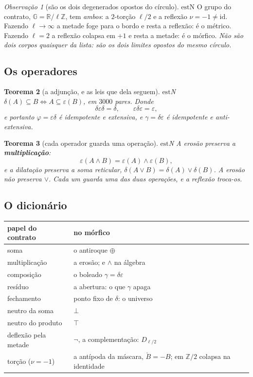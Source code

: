 \documentclass[11pt]{article}
\theoremstyle{plain}
\newtheorem{teorema}{Teorema}
\theoremstyle{remark}
\providecommand{\est}{\ensuremath{\mathrm{est}}}
\providecommand{\GG}{\ensuremath{\mathbb{G}}}
\providecommand{\RR}{\ensuremath{\mathbb{R}}}
\providecommand{\ZZ}{\ensuremath{\mathbb{Z}}}
\newtheorem{corolario}[teorema]{Observação}
\begin{document}
\begin{corolario}[são os dois degenerados opostos do círculo]\label{cor:degenerados}
\est{N} O grupo do contrato, $\GG=\RR/\ell\ZZ$, tem \emph{ambos}: a $2$-torção $\ell/2$ e a reflexão $\nu=-1\neq
\mathrm{id}$. Fazendo $\ell\to\infty$ a metade foge para o bordo e resta a reflexão: é o métrico. Fazendo
$\ell=2$ a reflexão colapsa em $+1$ e resta a metade: é o mórfico. \emph{Não são dois corpos quaisquer da lista:
são os dois limites opostos do mesmo círculo.}
\end{corolario}

\subsection{Os operadores}

\begin{teorema}[a adjunção, e as leis que dela seguem]\label{teo:adjuncao}
\est{N} $\delta(A)\subseteq B \iff A\subseteq\varepsilon(B)$, em $3000$ pares. Donde
\[
\delta\varepsilon\delta=\delta,
\qquad
\varepsilon\delta\varepsilon=\varepsilon,
\]
e portanto $\varphi=\varepsilon\delta$ é idempotente e extensiva, e $\gamma=\delta\varepsilon$ é idempotente e
anti-extensiva.
\end{teorema}

\begin{teorema}[cada operador guarda uma operação]\label{teo:guarda}
\est{N} A erosão preserva a \textbf{multiplicação}:
\[
\varepsilon(A\wedge B)=\varepsilon(A)\wedge\varepsilon(B),
\]
e a dilatação preserva a soma reticular, $\delta(A\vee B)=\delta(A)\vee\delta(B)$. A erosão \emph{não} preserva
$\vee$. Cada um guarda uma das duas operações, e a reflexão troca-os.
\end{teorema}

\subsection{O dicionário}

\begin{center}
\renewcommand{\arraystretch}{1.3}
\begin{tabular}{ll}
\hline
\textbf{papel do contrato} & \textbf{no mórfico}\\
\hline
soma & o antiroque $\oplus$\\
multiplicação & a erosão; e $\wedge$ na álgebra\\
composição & o boleado $\gamma=\delta\varepsilon$\\
resíduo & a abertura: o que $\gamma$ apaga\\
fechamento & ponto fixo de $\delta$: o universo\\
neutro da soma & $\bot$\\
neutro do produto & $\top$\\
deflexão pela metade & $\neg$, a complementação: $D_{\ell/2}$\\
torção ($\nu=-1$) & a antípoda da máscara, $\check B=-B$; em $\ZZ/2$ colapsa na identidade\\
\hline
\end{tabular}
\end{center}
\end{document}
